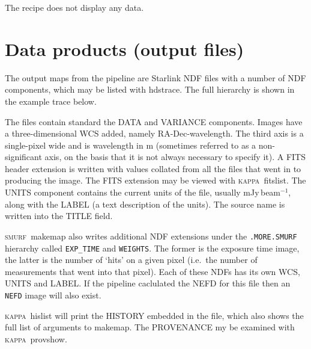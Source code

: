 \documentclass[twoside,11pt]{article}
\newcommand{\xlabel}[1]{}
\renewcommand{\_}{\texttt{\symbol{95}}}
\newcommand{\KAPPA}{\textsc{kappa}}
\newcommand{\SMURF}{\textsc{smurf}}
\newcommand{\task}[1]{\textsf{#1}}
\begin{document}
The recipe does not display any data.

\section{\xlabel{dataproducts}Data products (output files)\label{se:dataprod}}

The output maps from the pipeline are Starlink NDF files with a number
of NDF components, which may be listed with \task{hdstrace}. The
full hierarchy is shown in the example trace below.

The files contain standard the DATA and VARIANCE components. Images
have a three-dimensional WCS added, namely RA-Dec-wavelength. The
third axis is a single-pixel wide and is wavelength in m (sometimes
referred to as a non-significant axis, on the basis that it is not
always necessary to specify it). A FITS header extension is written
with values collated from all the files that went in to producing the
image. The FITS extension may be viewed with
\KAPPA\ \task{fitslist}. The UNITS component contains the current units
of the file, usually mJy\,beam$^{-1}$, along with the LABEL (a text
description of the units). The source name is written into the TITLE
field.

\SMURF\ \task{makemap} also writes additional NDF extensions under the
\verb+.MORE.SMURF+ hierarchy called \verb+EXP_TIME+ and
\verb+WEIGHTS+. The former is the exposure time image, the latter is
the number of `hits' on a given pixel (i.e.\ the number of
measurements that went into that pixel). Each of these NDFs has its
own WCS, UNITS and LABEL. If the pipeline caclulated the NEFD for this
file then an \verb+NEFD+ image will also exist.

\KAPPA\ \task{hislist} will print the HISTORY embedded in the file,
which also shows the full list of arguments to \task{makemap}. The
PROVENANCE my be examined with \KAPPA\ \task{provshow}.
\end{document}
